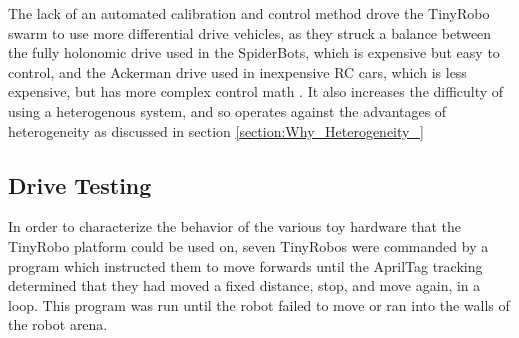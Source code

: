 The lack of an automated calibration and control method drove the TinyRobo swarm to use more differential drive vehicles, as they struck a balance between the fully holonomic drive used in the SpiderBots, which is expensive but easy to control, and the Ackerman drive used in inexpensive RC cars, which is less expensive, but has more complex control math \citep{lairdspider}.
It also increases the difficulty of using a heterogenous system, and so operates against the advantages of heterogeneity as discussed in section \ref{section:Why_Heterogeneity_}

%
%


\subsection{Drive Testing} \label{section:Drive_Testing}

In order to characterize the behavior of the various toy hardware that the TinyRobo platform could be used on, seven TinyRobos were commanded by a program which instructed them to move forwards until the AprilTag tracking determined that they had moved a fixed distance, stop, and move again, in a loop. This program was run until the robot failed to move or ran into the walls of the robot arena.

